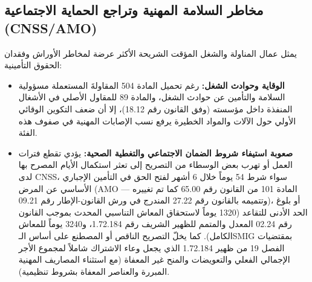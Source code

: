 \subsection{مخاطر السلامة المهنية وتراجع الحماية الاجتماعية (\texorpdfstring{\textenglish{CNSS/AMO}}{CNSS/AMO})}
يمثل عمال المناولة والشغل المؤقت الشريحة الأكثر عرضة لمخاطر الأوراش وفقدان الحقوق التأمينية:
\begin{itemize}[leftmargin=*, itemsep=5pt]
    \item \textbf{الوقاية وحوادث الشغل:} رغم تحميل المادة \textenglish{504} المقاولةَ المستعملة مسؤولية السلامة والتأمين عن حوادث الشغل، والمادة \textenglish{89} للمقاول الأصلي في الأشغال المنفذة داخل مؤسسته (وفق القانون رقم \textenglish{18.12})، إلا أن ضعف التكوين الوقائي الأولي حول الآلات والمواد الخطيرة يرفع نسب الإصابات المهنية في صفوف هذه الفئة.
    \item \textbf{صعوبة استيفاء شروط الضمان الاجتماعي والتغطية الصحية:} يؤدي تقطع فترات العمل أو تهرب بعض الوسطاء من التصريح إلى تعثر استكمال الأيام المصرح بها لدى \textenglish{CNSS}، سواء شرط \textenglish{54} يوماً خلال \textenglish{6} أشهر لفتح الحق في التأمين الإجباري الأساسي عن المرض (\textenglish{AMO} --- المادة \textenglish{101} من القانون رقم \textenglish{65.00} كما تم تغييره وتتميمه بالقانون رقم \textenglish{27.22} المندرج في ورش القانون-الإطار رقم \textenglish{09.21})، أو بلوغ الحد الأدنى للتقاعد (\textenglish{1320} يوماً لاستحقاق المعاش التناسبي المحدث بموجب القانون رقم \textenglish{02.24} المعدل والمتمم للظهير الشريف رقم \textenglish{1.72.184}، و\textenglish{3240} يوماً للمعاش الكامل). كما يخلّ التصريح الناقص أو المصطنع على أساس الـ\textenglish{SMIG} بمقتضيات الفصل \textenglish{19} من ظهير \textenglish{1.72.184} الذي يجعل وعاء الاشتراك شاملاً لمجموع الأجر الإجمالي الفعلي والتعويضات والمنح غير المعفاة (مع استثناء المصاريف المهنية المبررة والعناصر المعفاة بشروط تنظيمية).
\end{itemize}

